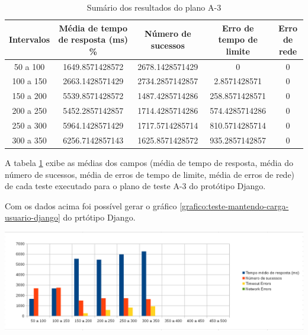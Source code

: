  \begin{table}[H]
    \centering
    \footnotesize
    \setlength{\abovecaptionskip}{0pt}
    \setlength{\belowcaptionskip}{0pt}
    \caption[Sumário dos resultados do plano A-3]{Sumário dos resultados do plano A-3}
    \label{tab:sumario-resultado-plano-teste-a-3}
    \begin{tabular}{c|c|c|c|c}
      \hline \hline
      Intervalos  & 	Média de tempo de resposta (ms) \% &	Número de sucessos & 	Erro de tempo de limite &	Erro de rede \\ 
      \hline \hline
      50 a 100 &		1649.8571428572 &		2678.1428571429 & 	0 &				0 \\
      100 a 150&		2663.1428571429 &		2734.2857142857 & 	2.8571428571  &			0 \\
      150 a 200&		5539.8571428572 &		1487.4285714286 & 	258.8571428571 &		0 \\
      200 a 250&		5452.2857142857 &		1714.4285714286 & 	574.4285714286 &		0 \\
      250 a 300&		5964.1428571429 &		1717.5714285714 & 	810.5714285714 &		0 \\
      300 a 350&		6256.7142857143 &		1625.8571428572 & 	935.2857142857 &		0 \\
      \hline \hline
    \end{tabular}
  \end{table}
   
  A tabela \ref{tab:sumario-resultado-plano-teste-a-3} exibe as médias dos campos (média de tempo de resposta, 
  média do número de sucessos, média de erros de tempo de limite, média de erros de rede) de cada teste executado 
  para o plano de teste A-3 do protótipo Django.
  
  Com os dados acima foi possível gerar o gráfico \ref{grafico:teste-mantendo-carga-usuario-django} do 
  prtótipo Django.
  
  \begin{grafico}[H]
    \setlength{\abovecaptionskip}{5pt}
    \setlength{\belowcaptionskip}{0pt}
    \label{grafico:teste-mantendo-carga-usuario-django}
    \caption[Mantendo a carga de usuários no Django]
	    {Mantendo a carga de usuários no Django}
    \centering
    \includegraphics[width=.80\textwidth]{imagem/graficos/grafico_django_plano_de_teste_3.png}
    \captionsetup[grafico]{justification=centering}
  \end{grafico}
  
